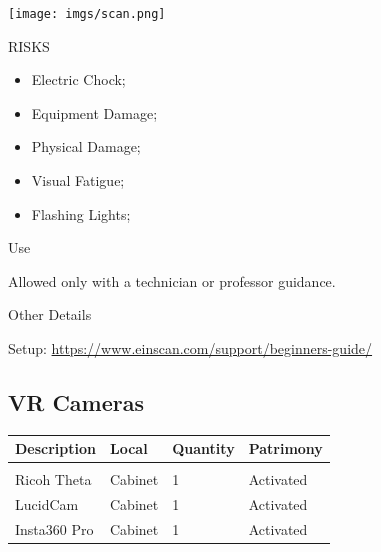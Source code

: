 \begin{multicols}{2}

\texttt{[image: imgs/scan.png]}

\columnbreak

\begin{mdframed}[roundcorner=10pt, linecolor=red, linewidth=2pt]
\vspace{1em}
{\Large {\color{red}RISKS}}
\vspace{1em}

\begin{itemize}
    \item Electric Chock;
    \item Equipment Damage;
    \item Physical Damage;
    \item Visual Fatigue; 
    \item Flashing Lights;
\end{itemize}

\vspace{1em}
\end{mdframed}

\vspace{2em}

{\Large Use}
\vspace{1em}

Allowed only with a technician or professor guidance.
\end{multicols}

{\Large Other Details}
\vspace{1em}

Setup: \url{https://www.einscan.com/support/beginners-guide/}
\newpage


\subsection{VR Cameras}
\begin{tabularx}{\textwidth}{ Y  Y  Y  Y }
    \textbf{Description} &  \textbf{Local} &  \textbf{Quantity} & \textbf{Patrimony} \\
    \hline \\
     Ricoh Theta & Cabinet & 1 & Activated \\
     LucidCam & Cabinet & 1 & Activated \\
     Insta360 Pro & Cabinet & 1 & Activated \\
     
\end{tabularx}
\vspace{1cm}

